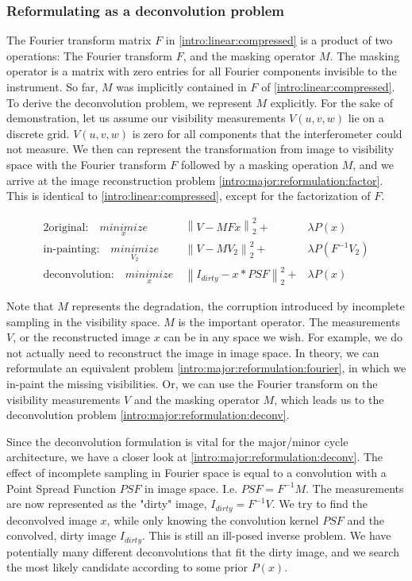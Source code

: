 \subsubsection{Reformulating as a deconvolution problem}\label{intro:major:reformulation}
The Fourier transform matrix $F$ in \eqref{intro:linear:compressed} is a product of two operations: The Fourier transform $F$, and the masking operator $M$. The masking operator is a matrix with zero entries for all Fourier components invisible to the instrument. So far, $M$ was implicitly contained in $F$ of \eqref{intro:linear:compressed}. To derive the deconvolution problem, we represent $M$ explicitly. For the sake of demonstration, let us assume our visibility measurements $V(u, v ,w)$ lie on a discrete grid. $V(u, v, w)$ is zero for all components that the interferometer could not measure. We then can represent the transformation from image to visibility space with the Fourier transform $F$ followed by a masking operation $M$, and we arrive at the image reconstruction problem \eqref{intro:major:reformulation:factor}. This is identical to \eqref{intro:linear:compressed}, except for the factorization of $F$.

\begin{alignat}{2}
\text{original:} \quad \underset{x}{minimize}\:& \left \| V - M Fx \right \|_2^2 + &\lambda P(x) \label{intro:major:reformulation:factor}\\ 
\text{in-painting:} \quad\underset{V_2}{minimize}\:& \left \| V - M V_2 \right \|_2^2 + &\lambda P(F^{-1}V_2) \label{intro:major:reformulation:fourier} \\
\text{deconvolution:} \quad \underset{x}{minimize}\:& \left \| I_{dirty} - x * PSF \right \|_2^2 + &\lambda P(x) \label{intro:major:reformulation:deconv}
\end{alignat}

Note that $M$ represents the degradation, the corruption introduced by incomplete sampling in the visibility space. $M$ is the important operator. The measurements $V$, or the reconstructed image $x$ can be in any space we wish. For example, we do not actually need to reconstruct the image in image space. In theory, we can reformulate an equivalent problem \eqref{intro:major:reformulation:fourier}, in which we in-paint the missing visibilities. Or, we can use the Fourier transform on the visibility measurements $V$ and the masking operator $M$, which leads us to the deconvolution problem \eqref{intro:major:reformulation:deconv}. 

Since the deconvolution formulation is vital for the major/minor cycle architecture, we have a closer look at \eqref{intro:major:reformulation:deconv}. The effect of incomplete sampling in Fourier space is equal to a convolution with a Point Spread Function $PSF$ in image space. I.e. $PSF = F^{-1}M$. The measurements are now represented as the "dirty" image, $I_{dirty} = F^{-1}V$. We try to find the deconvolved image $x$, while only knowing the convolution kernel $PSF$ and the convolved, dirty image $I_{dirty}$. This is still an ill-posed inverse problem. We have potentially many different deconvolutions that fit the dirty image, and we search the most likely candidate according to some prior $P(x)$. 

